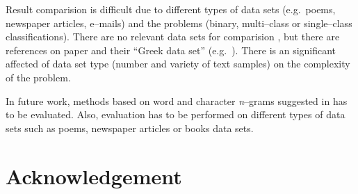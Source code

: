 \documentclass[11pt,english]{article}
\begin{document}
\begin{multicols}{2}
Result comparision is difficult due to different types of data sets (e.g.\ poems,
newspaper articles, e--mails) and the problems (binary, multi--class or
single--class classifications). There are no relevant data sets for comparision
\citep{zhao2005effective}, but there are references on paper
\citep{stamatatos2001computer} and their ``Greek data set'' (e.g.\
\citep{keselj2003n}). There is an significant affected of data set type (number
and variety of text samples) on the complexity of the problem.

In future work, methods based on word and character \emph{n}--grams suggested
in \citep{keselj2003n,peng2003language,coyotl2006authorship} has to be
evaluated. Also, evaluation has to be performed on different types of data sets
such as poems, newspaper articles or books data sets.

\section*{Acknowledgement}




\end{multicols}
\end{document}
